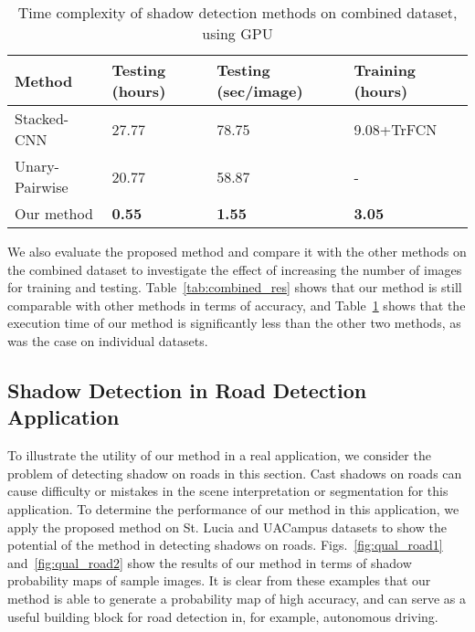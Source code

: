 \documentclass[letterpaper, 10 pt, conference]{ieeeconf}
\begin{document}
\begin {table}[b]
\caption[Time complexity of shadow detection methods on combined dataset, using GPU]{Time complexity of shadow detection methods on combined dataset, using GPU} \label{tab:combined_time_gpu}
\begin{center}
\begin{tabular}{ |p{1.9cm}||p{1.48cm}|p{1.48cm}|p{1.55cm}|  }
\hline
 Method& Testing (hours)& Testing (sec/image) & Training (hours)\\
 \hline
 Stacked-CNN & 27.77 & 78.75 & 9.08+TrFCN \\Unary-Pairwise &   20.77 & 58.87 & -\\
 Our method & \textbf{0.55}& \textbf{1.55}& \textbf{3.05}\\
 \hline
\end {tabular}
\end{center}
\end {table}

We also evaluate the proposed method and compare it with the other methods on the combined dataset to investigate the effect of increasing the number of images for training and testing. Table~\ref{tab:combined_res} shows that our method is still comparable with other methods in terms of accuracy, and Table~\ref{tab:combined_time_gpu} shows that the execution time of our method is significantly less than the other two methods, as was the case on individual datasets.















\subsection{Shadow Detection in Road Detection Application}
\label{road_res}
To illustrate the utility of our method in a real application, we consider the problem of detecting shadow on roads in this section. Cast shadows on roads can cause difficulty or mistakes in the scene interpretation or segmentation for this application. To determine the performance of our method in this application, we apply the proposed method on St. Lucia and UACampus datasets to show the potential of the method in detecting shadows on roads. Figs.~\ref{fig:qual_road1} and~\ref{fig:qual_road2} show the results of our method in terms of shadow probability maps of sample images.  It is clear from these examples that our method is able to generate a probability map of high accuracy, and can serve as a useful building block for road detection in, for example, autonomous driving. 
\end{document}
